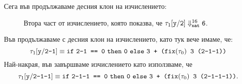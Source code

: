 \begin{landscape}
Сега във  продължаваме десния клон на изчислението:
  \begin{framed}
    \begin{figure}[H]
      \begin{prooftree}
      \end{prooftree}
      \caption{Втора част от изчислението, която показва, че $\tau_1\substConst{y}{2} \opsem{16}{nat} \vv{6}$.}
      \label{fig:operational-cbn-example:second-part}
    \end{figure}
  \end{framed}

  Във  продължаваме с десния клон на изчислението, като тук вече имаме, че:
  \[\tau_1\substConst{y}{2-1} \equiv \ifelse{\vv{2-1 == 0}}{\vv{0}}{\vv{3 + (}\fix(\tau_0)\vv{ 3 (2-1-1))}}\]
  Най-накрая, във  завършваме изчислението като използваме, че
  \[\tau_1\substConst{y}{2-1-1} \equiv \ifelse{\vv{2-1-1 == 0}}{\vv{0}}{\vv{3 + (}\fix(\tau_0)\vv{ 3 (2-1-1-1))}}.\]
  

\end{landscape}
